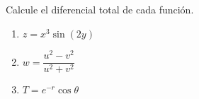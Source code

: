 Calcule el diferencial total de cada función.
\begin{enumerate}
    \item $z = x^3 \sin(2y)$
    \item $w = \dfrac{u^2 - v^2}{u^2 + v^2}$
    \item $T = e^{-r}\cos\theta$
\end{enumerate}
